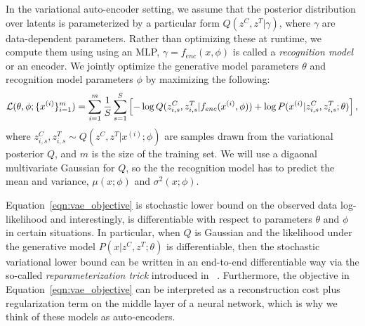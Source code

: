 In the variational auto-encoder setting, we assume that the posterior
distribution over latents is parameterized by a particular form 
 $Q(z^C, z^T|\gamma)$,
where $\gamma$ are data-dependent parameters.
Rather than optimizing these at runtime,
we compute them using using
an MLP, $\gamma=f_{enc}(x,\phi)$ is called a \emph{recognition model} or an
encoder.
We jointly optimize the generative model parameters $\theta$ and
recognition model parameters $\phi$ by maximizing the following:
\begin{equation}\label{eqn:vae_objective}\footnotesize
\mathcal{L}(\theta, \phi; \{x^{(i)}\}_{i=1}^m)
	= \sum_{i=1}^m \frac{1}{S}\sum_{s=1}^S \left[-\log
          Q(z_{i,s}^C, z_{i,s}^T | f_{enc}(x^{(i)},\phi)) 
+ \log P(x^{(i)} | z_{i,s}^C, z_{i,s}^T; \theta) \right],
\end{equation}
where $z_{i,s}^C, z_{i,s}^T \sim Q(z^C, z^T | x^{(i)};\phi) $ are
samples drawn from the variational posterior $Q$, and $m$ is the size
of the training set.
We will use a digaonal multivariate Gaussian for $Q$, so the 
the recognition model has to predict the mean and  variance,
 $\mu(x;\phi)$ and $\sigma^2(x;\phi)$.


Equation~\ref{eqn:vae_objective} is stochastic lower bound on the observed data log-likelihood and interestingly,
is differentiable with respect to parameters $\theta$ and $\phi$ in certain situations. In particular,
when $Q$ is Gaussian and the likelihood under the generative model $P(x|z^C,z^T; \theta)$ is differentiable, 
then the stochastic variational lower bound can be written in an end-to-end
differentiable way via the so-called \emph{reparameterization trick} introduced in ~\cite{Kingma2014}.
Furthermore, the objective in Equation~\ref{eqn:vae_objective} can be interpreted as a reconstruction cost plus regularization term on the middle layer
of a neural network, which is why we think of these models as auto-encoders.  




